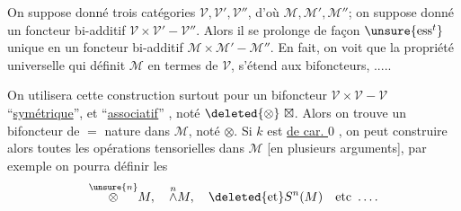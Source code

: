 
On suppose donné trois catégories 
\(\mathcal V,\mathcal V',\mathcal V''\),
d'où \(\mathcal M,\mathcal M',\mathcal M''\); on suppose donné un
foncteur bi-additif \(\mathcal V\times\mathcal V'\mathbin{-}\mathcal V''\).
Alors il se
prolonge de façon \(\unsure{\mathrm{ess}^{t}}\) unique en un
foncteur bi-additif \(\mathcal M\times\mathcal M'\mathbin{-}\mathcal M''\).
En fait,
on voit que la propriété universelle qui
définit \(\mathcal M\) en termes de \(\mathcal V\), s'étend aux
bifoncteurs, .....

On  utilisera cette construction surtout
pour un bifoncteur \(\mathcal V\times\mathcal V\mathbin{-}\mathcal V\)
``\uline{symétrique}'', et ``\uline{associatif}''
, noté \(\deleted{\otimes}\ \boxtimes\).
Alors
on trouve un bifoncteur de \(=\) nature dans
\(\mathcal M\), noté \(\otimes\). Si \(k\) est \uline{de car. \(0\)}
, on peut
construire alors toutes les opérations tensorielles 
dans \(\mathcal M\) [en plusieurs arguments], par
exemple on pourra définir les
\[
\overset{\unsure{n}}{\otimes}M,\quad
\overset{n}{\wedge}M,\quad
\deleted{\text{et}} S^n(M)\quad\text{etc}\ \ldots.
\]
